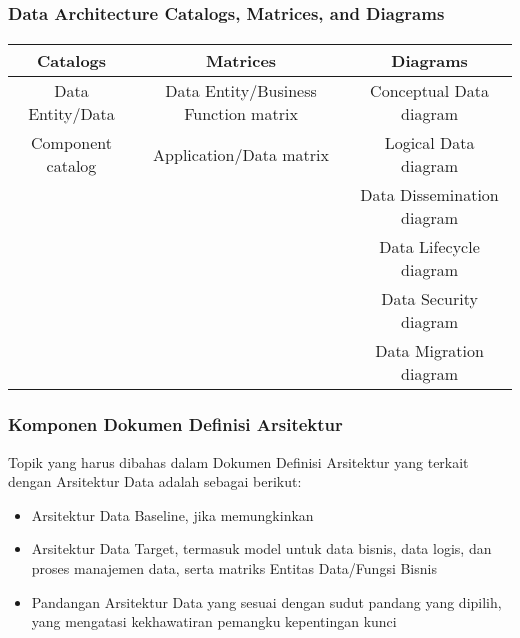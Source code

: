 \documentclass[aspectratio=169, table]{beamer}
\begin{document}
    \begin{frame}
        \frametitle{ Data Architecture Catalogs, Matrices, and Diagrams}
        \framesubtitle{\hspace{1cm}}
        \begin{small}
            \begin{table}[]
                \begin{tabular}{|c|c|c|}
                    \hline
                    \textbf{Catalogs} & \textbf{Matrices} & \textbf{Diagrams} \\ \hline
                    Data Entity/Data & Data Entity/Business Function matrix & Conceptual Data diagram \\
                    Component catalog & Application/Data matrix & Logical Data diagram \\
                    & & Data Dissemination diagram \\
                    & & Data Lifecycle diagram \\
                    & & Data Security diagram \\
                    & & Data Migration diagram \\ \hline
                \end{tabular}
            \end{table}
        \end{small}
    \end{frame}

	\begin{frame}
	\frametitle{Komponen Dokumen Definisi Arsitektur}
	Topik yang harus dibahas dalam Dokumen Definisi Arsitektur yang terkait dengan Arsitektur Data adalah sebagai berikut:
	\begin{itemize}
		\item Arsitektur Data Baseline, jika memungkinkan
		\item Arsitektur Data Target, termasuk model untuk data bisnis, data logis, dan proses manajemen data, serta matriks Entitas Data/Fungsi Bisnis
		\item Pandangan Arsitektur Data yang sesuai dengan sudut pandang yang dipilih, yang mengatasi kekhawatiran pemangku kepentingan kunci
	\end{itemize}
\end{frame}
\end{document}
